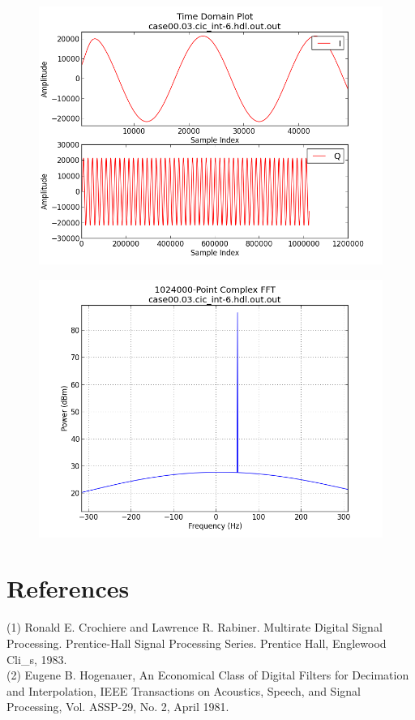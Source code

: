 \documentclass{article}
\begin{document}
	\begin{figure}[ht]
		\centering
		\begin{minipage}{.5\textwidth}
			\centering\includegraphics[width=1.0\linewidth]{output_time_R2048}
			\label{fig:output_time_R2048}
		\end{minipage}%
		\begin{minipage}{.5\textwidth}
			\centering\includegraphics[width=1.0\linewidth]{output_freq_R2048}
			\label{fig:output_freq_R2048}
		\end{minipage}
	\end{figure}

\section*{References}
(1)	Ronald E. Crochiere and Lawrence R. Rabiner. Multirate Digital Signal Processing. Prentice-Hall Signal Processing Series. Prentice Hall, Englewood Cli\_s, 1983. \\
(2)	Eugene B. Hogenauer, An Economical Class of Digital Filters for Decimation and Interpolation, IEEE Transactions on Acoustics, Speech, and Signal Processing, Vol. ASSP-29, No. 2, April 1981.
\end{document}
